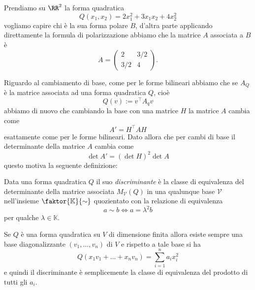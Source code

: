 \documentclass[11pt]{scrartcl}
\newcommand{\KK}{\mathbb{K}}
\begin{document}
	\begin{example}[Polinomi]
		Prendiamo su $\RR^2$ la forma quadratica
		$$Q(x_1,x_2)=2x_1^2+3x_1x_2+4x_2^2$$
		vogliamo capire chi è la sua forma polare $B$, d'altra parte applicando direttamente la formula di polarizzazione abbiamo che la matrice $A$ associata a $B$ è
		$$A=\begin{pmatrix}
			2 & 3/2 \\
			3/2 & 4
		\end{pmatrix}.$$
	\end{example}
	Riguardo al cambiamento di base, come per le forme bilineari abbiamo che se $A_Q$ è la matrice associata ad una forma quadratica $Q$, cioè
	$$Q(v):=v^\intercal A_q v$$
	abbiamo di nuovo che cambiando la base con una matrice $H$ la matrice $A$ cambia come
	$$A'=H^\intercal A H$$
	esattamente come per le forme bilineari. Dato allora che per cambi di base il determinante della matrice $A$ cambia come
	$$\det A'=\left(\det H\right)^2 \det A$$
	questo motiva la seguente definizione:
	\begin{definition}[Discriminante]
		Data una forma quadratica $Q$ il suo \textit{discriminante} è la classe di equivalenza del determinante della matrice associata $M_\mathcal{V}(Q)$ in una qualunque base $\mathcal{V}$ nell'insieme $\faktor{\KK}{\sim}$ quozientato con la relazione di equivalenza
		$$a\sim b \iff a=\lambda^2b$$
		per qualche $\lambda\in \KK$.
	\end{definition}
	\begin{example}[Diagonalizzazione]
		Se $Q$ è una forma quadratica su $V$ di dimensione finita allora esiste sempre una base diagonalizzante $\left(v_1,\dots,v_n\right)$ di $V$ e rispetto a tale base si ha
		$$Q(x_1v_1+\dots+x_nv_n)=\sum_{i=1}^{n}a_ix_i^2$$
		e quindi il discriminante è semplicemente la classe di equivalenza del prodotto di tutti gli $a_i$.
	\end{example}
	
\end{document}
